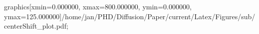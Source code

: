 graphics[xmin=0.000000, xmax=800.000000, ymin=0.000000, ymax=125.000000]{/home/jan/PHD/Diffusion/Paper/current/Latex/Figures/sub/centerShift_plot.pdf}; 
